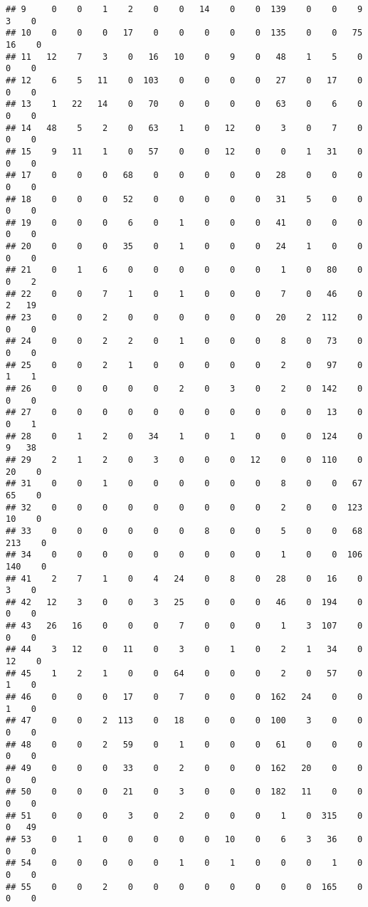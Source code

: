 \documentclass[
]{book}
\begin{document}
\begin{verbatim}
## 9     0    0    1    2    0    0   14    0    0  139    0    0    9    3    0
## 10    0    0    0   17    0    0    0    0    0  135    0    0   75   16    0
## 11   12    7    3    0   16   10    0    9    0   48    1    5    0    0    0
## 12    6    5   11    0  103    0    0    0    0   27    0   17    0    0    0
## 13    1   22   14    0   70    0    0    0    0   63    0    6    0    0    0
## 14   48    5    2    0   63    1    0   12    0    3    0    7    0    0    0
## 15    9   11    1    0   57    0    0   12    0    0    1   31    0    0    0
## 17    0    0    0   68    0    0    0    0    0   28    0    0    0    0    0
## 18    0    0    0   52    0    0    0    0    0   31    5    0    0    0    0
## 19    0    0    0    6    0    1    0    0    0   41    0    0    0    0    0
## 20    0    0    0   35    0    1    0    0    0   24    1    0    0    0    0
## 21    0    1    6    0    0    0    0    0    0    1    0   80    0    0    2
## 22    0    0    7    1    0    1    0    0    0    7    0   46    0    2   19
## 23    0    0    2    0    0    0    0    0    0   20    2  112    0    0    0
## 24    0    0    2    2    0    1    0    0    0    8    0   73    0    0    0
## 25    0    0    2    1    0    0    0    0    0    2    0   97    0    1    1
## 26    0    0    0    0    0    2    0    3    0    2    0  142    0    0    0
## 27    0    0    0    0    0    0    0    0    0    0    0   13    0    0    1
## 28    0    1    2    0   34    1    0    1    0    0    0  124    0    9   38
## 29    2    1    2    0    3    0    0    0   12    0    0  110    0   20    0
## 31    0    0    1    0    0    0    0    0    0    8    0    0   67   65    0
## 32    0    0    0    0    0    0    0    0    0    2    0    0  123   10    0
## 33    0    0    0    0    0    0    8    0    0    5    0    0   68  213    0
## 34    0    0    0    0    0    0    0    0    0    1    0    0  106  140    0
## 41    2    7    1    0    4   24    0    8    0   28    0   16    0    3    0
## 42   12    3    0    0    3   25    0    0    0   46    0  194    0    0    0
## 43   26   16    0    0    0    7    0    0    0    1    3  107    0    0    0
## 44    3   12    0   11    0    3    0    1    0    2    1   34    0   12    0
## 45    1    2    1    0    0   64    0    0    0    2    0   57    0    1    0
## 46    0    0    0   17    0    7    0    0    0  162   24    0    0    1    0
## 47    0    0    2  113    0   18    0    0    0  100    3    0    0    0    0
## 48    0    0    2   59    0    1    0    0    0   61    0    0    0    0    0
## 49    0    0    0   33    0    2    0    0    0  162   20    0    0    0    0
## 50    0    0    0   21    0    3    0    0    0  182   11    0    0    0    0
## 51    0    0    0    3    0    2    0    0    0    1    0  315    0    0   49
## 53    0    1    0    0    0    0    0   10    0    6    3   36    0    0    0
## 54    0    0    0    0    0    1    0    1    0    0    0    1    0    0    0
## 55    0    0    2    0    0    0    0    0    0    0    0  165    0    0    0
\end{verbatim}
\end{document}
